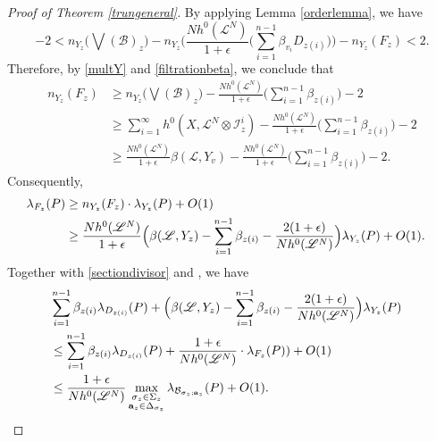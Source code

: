 \documentclass[10pt]{amsart}
\numberwithin{equation}{section}
\theoremstyle{plain}
\theoremstyle{definition}
\begin{document}
\begin{proof}[Proof of Theorem \ref{trungeneral}]
By applying Lemma \ref{orderlemma}, we have
\begin{equation*}
    -2<n_{Y_z}\Big( \bigvee(\mathcal{B})_z \Big)-n_{Y_z}\Big(\frac{Nh^0(\mathscr{L}^N)}{1+\epsilon}\big( \sum_{i=1}^{n-1}\beta_{v_i}D_{z(i)}\big)\Big)-n_{Y_z}(F_z)<2.
\end{equation*}
Therefore, by \eqref{multY} and \eqref{filtrationbeta}, we conclude that
\begin{align*}
n_{Y_z}(F_z)&\ge n_{Y_z}\Big( \bigvee(\mathcal{B})_z \Big)- \frac{Nh^0(\mathscr L^N)}{1+\epsilon} \big( \sum_{i=1}^{n-1}\beta_{z(i)}\big)-2\\
&\ge \sum_{i=1}^{\infty} h^0(X, {\mathscr L}^N\otimes {\mathscr I}_z^i )-  \frac{Nh^0(\mathscr L^N)}{1+\epsilon} \big( \sum_{i=1}^{n-1}\beta_{z(i)}\big) -2\\
&\ge \frac{Nh^0(\mathscr L^N)}{1+\epsilon} \beta( {\mathscr L}, Y_v)-  \frac{Nh^0(\mathscr L^N)}{1+\epsilon} \big( \sum_{i=1}^{n-1}\beta_{z(i)}\big) -2.\quad 
\end{align*}
Consequently,
\begin{align}\label{Fv}
\lambda_{F_z}(P)&\ge n_{Y_z}(F_z)\cdot\lambda_{Y_z}(P)+O(1)\cr
&\ge \frac{Nh^0(\mathscr L^N)}{1+\epsilon} \Big(\beta( {\mathscr L}, Y_z)-    \sum_{i=1}^{n-1}\beta_{z(i)}  -\frac{2(1+\epsilon)}{Nh^0(\mathscr{L}^N)}\Big)\lambda_{Y_z}(P)+O(1).
\end{align}
Together with \eqref{sectiondivisor} and \cite[Proposition 4.13]{RV20}, we have 
\begin{align}\label{lambdaineq}
 &\sum_{i=1}^{n-1}\beta_{z(i)}\lambda_{D_{z(i)}}(P) 
 +\Big( \beta( {\mathscr L}, Y_z)-   \sum_{i=1}^{n-1 }\beta_{z(i)}  -\frac{2(1+\epsilon)}{Nh^0(\mathscr{L}^N)}\Big)  \lambda_{Y_z}(P)\cr
&\le    \sum_{i=1}^{n-1}\beta_{z(i)}\lambda_{D_{z(i)}}(P) +\frac{1+\epsilon}{Nh^0(\mathscr L^N)} \cdot\lambda_{F_z}(P))+O(1)\cr
&\le\frac{1+\epsilon}{Nh^0(\mathscr L^N)} \max_{\substack{\sigma_z\in\Sigma_z \\ \mathbf a_z \in \Delta_{\sigma_z}}} 
 \lambda_{ \mathcal B _{\sigma_z;\mathbf{a}_z}}(P)+O(1).
\end{align}
 

\end{proof}
\end{document}
